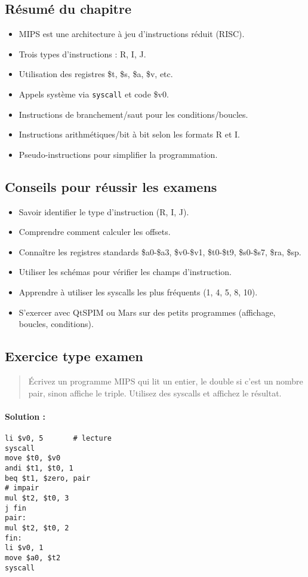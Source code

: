 \documentclass[12pt,a4paper]{article}
\begin{document}
\subsection{Résumé du chapitre}
\begin{itemize}
  \item MIPS est une architecture à jeu d'instructions réduit (RISC).
  \item Trois types d'instructions : R, I, J.
  \item Utilisation des registres \$t, \$s, \$a, \$v, etc.
  \item Appels système via \texttt{syscall} et code \$v0.
  \item Instructions de branchement/saut pour les conditions/boucles.
  \item Instructions arithmétiques/bit à bit selon les formats R et I.
  \item Pseudo-instructions pour simplifier la programmation.
\end{itemize}

\subsection{Conseils pour réussir les examens}
\begin{itemize}
  \item Savoir identifier le type d'instruction (R, I, J).
  \item Comprendre comment calculer les offsets.
  \item Connaître les registres standards \$a0-\$a3, \$v0-\$v1, \$t0-\$t9, \$s0-\$s7, \$ra, \$sp.
  \item Utiliser les schémas pour vérifier les champs d'instruction.
  \item Apprendre à utiliser les syscalls les plus fréquents (1, 4, 5, 8, 10).
  \item S’exercer avec QtSPIM ou Mars sur des petits programmes (affichage, boucles, conditions).
\end{itemize}

\subsection{Exercice type examen}
\begin{quote}
Écrivez un programme MIPS qui lit un entier, le double si c’est un nombre pair, sinon affiche le triple. Utilisez des syscalls et affichez le résultat.
\end{quote}

\paragraph{Solution :}
\begin{verbatim}
li $v0, 5       # lecture
syscall
move $t0, $v0
andi $t1, $t0, 1
beq $t1, $zero, pair
# impair
mul $t2, $t0, 3
j fin
pair:
mul $t2, $t0, 2
fin:
li $v0, 1
move $a0, $t2
syscall
\end{verbatim}

\newpage
\end{document}
